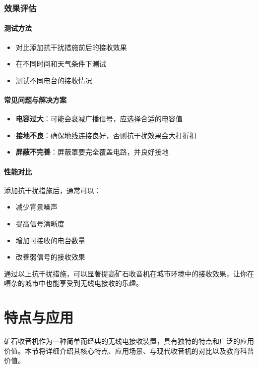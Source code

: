 \documentclass[12pt,UTF8]{ctexbook}
\begin{document}
\subsubsection{效果评估}

\paragraph{测试方法}
\begin{itemize}
  \item 对比添加抗干扰措施前后的接收效果
  \item 在不同时间和天气条件下测试
  \item 测试不同电台的接收情况
\end{itemize}

\paragraph{常见问题与解决方案}
\begin{itemize}
  \item \textbf{电容过大}：可能会衰减广播信号，应选择合适的电容值
  \item \textbf{接地不良}：确保地线连接良好，否则抗干扰效果会大打折扣
  \item \textbf{屏蔽不完善}：屏蔽罩要完全覆盖电路，并良好接地
\end{itemize}

\paragraph{性能对比}
添加抗干扰措施后，通常可以：
\begin{itemize}
  \item 减少背景噪声
  \item 提高信号清晰度
  \item 增加可接收的电台数量
  \item 改善弱信号的接收效果
\end{itemize}

通过以上抗干扰措施，可以显著提高矿石收音机在城市环境中的接收效果，让你在嘈杂的城市中也能享受到无线电接收的乐趣。

\section{特点与应用}

矿石收音机作为一种简单而经典的无线电接收装置，具有独特的特点和广泛的应用价值。本节将详细介绍其核心特点、应用场景、与现代收音机的对比以及教育科普价值。
\end{document}
